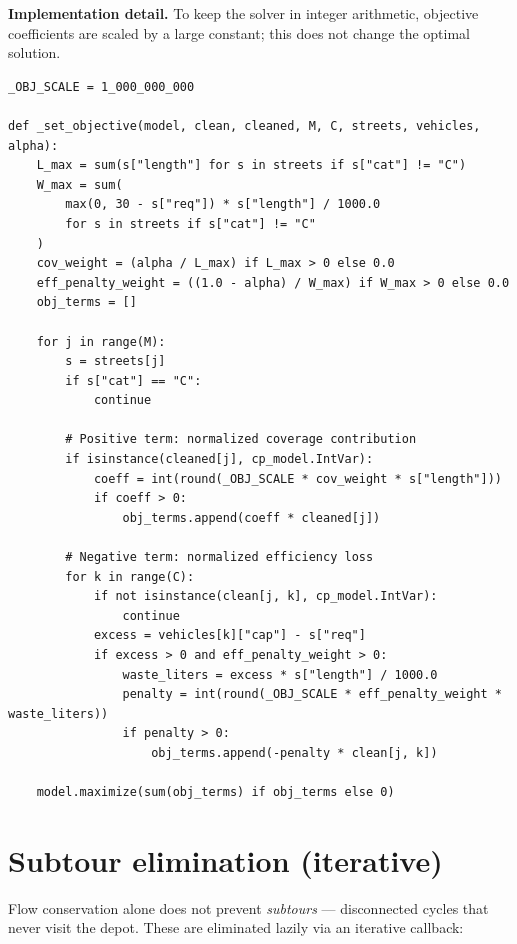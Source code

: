 \documentclass[11pt]{article}
\begin{document}
\medskip\noindent
\textbf{Implementation detail.}
To keep the solver in integer arithmetic, objective coefficients are scaled
by a large constant; this does not change the optimal solution.

\begin{lstlisting}[caption={Objective function implementation}]
_OBJ_SCALE = 1_000_000_000

def _set_objective(model, clean, cleaned, M, C, streets, vehicles, alpha):
    L_max = sum(s["length"] for s in streets if s["cat"] != "C")
    W_max = sum(
        max(0, 30 - s["req"]) * s["length"] / 1000.0
        for s in streets if s["cat"] != "C"
    )
    cov_weight = (alpha / L_max) if L_max > 0 else 0.0
    eff_penalty_weight = ((1.0 - alpha) / W_max) if W_max > 0 else 0.0
    obj_terms = []

    for j in range(M):
        s = streets[j]
        if s["cat"] == "C":
            continue

        # Positive term: normalized coverage contribution
        if isinstance(cleaned[j], cp_model.IntVar):
            coeff = int(round(_OBJ_SCALE * cov_weight * s["length"]))
            if coeff > 0:
                obj_terms.append(coeff * cleaned[j])

        # Negative term: normalized efficiency loss
        for k in range(C):
            if not isinstance(clean[j, k], cp_model.IntVar):
                continue
            excess = vehicles[k]["cap"] - s["req"]
            if excess > 0 and eff_penalty_weight > 0:
                waste_liters = excess * s["length"] / 1000.0
                penalty = int(round(_OBJ_SCALE * eff_penalty_weight * waste_liters))
                if penalty > 0:
                    obj_terms.append(-penalty * clean[j, k])

    model.maximize(sum(obj_terms) if obj_terms else 0)
\end{lstlisting}

\section{Subtour elimination (iterative)}

Flow conservation alone does not prevent \emph{subtours} — disconnected
cycles that never visit the depot.  These are eliminated lazily via an
iterative callback:
\end{document}
